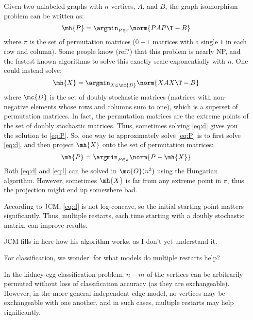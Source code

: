 Given two unlabeled graphs with $n$ vertices, $A$, and $B$, the graph isomorphism problem can be written as:
\begin{align} \label{eq:P}
	\mh{P} = \argmin_{P \in \pi} \norm{P A P\T - B}
\end{align}
where $\pi$ is the set of permutation matrices ($0-1$ matrices with a single $1$ in each row and column).  Some people know (ref?) that this problem is nearly NP, and the fastest known algorithms to solve this exactly scale exponentially with $n$.  One could instead solve:
\begin{align} \label{eq:d}
	\mh{X} = \argmin_{X \in \mc{D}} \norm{X A X\T - B}
\end{align}
where $\mc{D}$ is the set of doubly stochastic matrices (matrices with non-negative elements whose rows and columns sum to one), which is a superset of permutation matrices.  In fact, the permutation matrices are the extreme points of the set of doubly stochastic matrices. Thus, sometimes solving \eqref{eq:d} gives you the solution to \eqref{eq:P}. So, one way to approximately solve \eqref{eq:P} is to first solve \eqref{eq:d}, and then project $\mh{X}$ onto the set of permutation matrices:
\begin{align} \label{eq:l}
	\mh{P} = \argmin_{P \in \pi} \norm{P - \mh{X}}
\end{align}
Both \eqref{eq:d} and \eqref{eq:l} can be solved in $\mc{O}(n^3)$ using the Hungarian algorithm.  However, sometimes $\mh{X}$ is far from any extreme point in $\pi$, thus the projection might end up somewhere bad.

According to JCM, \eqref{eq:d} is not log-concave, so the initial starting point matters significantly.  Thus, multiple restarts, each time starting with a doubly stochastic matrix, can improve results.  

JCM fills in here how his algorithm works, as I don't yet understand it.

For classification, we wonder: for what models do multiple restarts help?

In the kidney-egg classification problem, $n-m$ of the vertices can be arbitrarily permuted without loss of classification accuracy (as they are exchangeable).  However, in the more general independent edge model, no vertices may be exchangeable with one another, and in such cases, multiple restarts may help significantly.






% 


% 
\clearpage


%

%


